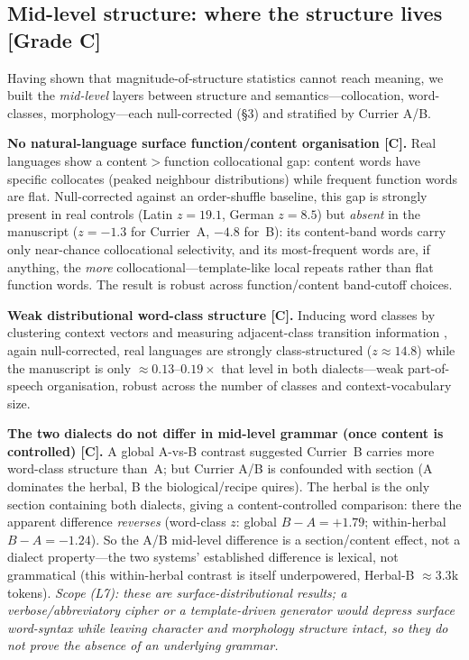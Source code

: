 \documentclass[11pt]{article}
\newcommand{\grade}[1]{{\small\textbf{[#1]}}}
\begin{document}
\subsection{Mid-level structure: where the structure lives \grade{Grade C}}
Having shown that magnitude-of-structure statistics cannot reach meaning, we built the
\emph{mid-level} layers between structure and semantics---collocation, word-classes,
morphology---each null-corrected (\S3) and stratified by Currier A/B.

\textbf{No natural-language surface function/content organisation \grade{C}.} Real
languages show a content$>$function collocational gap: content words have specific
collocates (peaked neighbour distributions) while frequent function words are flat.
Null-corrected against an order-shuffle baseline, this gap is strongly present in real
controls (Latin $z=19.1$, German $z=8.5$) but \emph{absent} in the manuscript
($z=-1.3$ for Currier~A, $-4.8$ for~B): its content-band words carry only near-chance
collocational selectivity, and its most-frequent words are, if anything, the \emph{more}
collocational---template-like local repeats rather than flat function words. The result
is robust across function/content band-cutoff choices.

\textbf{Weak distributional word-class structure \grade{C}.} Inducing word classes by
clustering context vectors and measuring adjacent-class transition information
\citep{brown1992class}, again null-corrected, real languages are strongly
class-structured ($z\approx14.8$) while the manuscript is only $\approx\!0.13$--$0.19\times$
that level in both dialects---weak part-of-speech organisation, robust across the number
of classes and context-vocabulary size.

\textbf{The two dialects do not differ in mid-level grammar (once content is
controlled) \grade{C}.} A global A-vs-B contrast suggested Currier~B carries more
word-class structure than~A; but Currier A/B is confounded with section (A dominates the
herbal, B the biological/recipe quires). The herbal is the only section containing both
dialects, giving a content-controlled comparison: there the apparent difference
\emph{reverses} (word-class $z$: global $B-A=+1.79$; within-herbal $B-A=-1.24$). So the
A/B mid-level difference is a section/content effect, not a dialect property---the two
systems' established difference is lexical, not grammatical (this within-herbal contrast
is itself underpowered, Herbal-B $\approx3.3$k tokens). \emph{Scope (L7): these are
surface-distributional results; a verbose/abbreviatory cipher or a template-driven
generator would depress surface word-syntax while leaving character and morphology
structure intact, so they do not prove the absence of an underlying grammar.}
\end{document}
